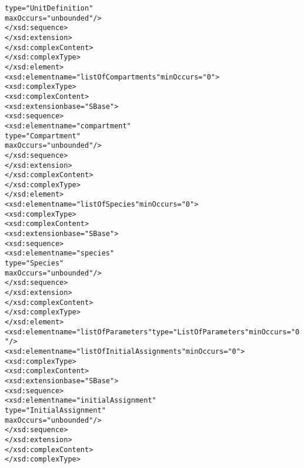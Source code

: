 \begin{alltt}
                                                     type="UnitDefinition" 
                                                     maxOccurs="unbounded"/>
                                    </xsd:sequence>
                                </xsd:extension>
                            </xsd:complexContent>
                        </xsd:complexType>
                    </xsd:element>
                    <xsd:element name="listOfCompartments" minOccurs="0">
                        <xsd:complexType>
                            <xsd:complexContent>
                                <xsd:extension base="SBase">
                                    <xsd:sequence>
                                        <xsd:element name="compartment" 
                                                     type="Compartment" 
                                                     maxOccurs="unbounded"/>
                                    </xsd:sequence>
                                </xsd:extension>
                            </xsd:complexContent>
                        </xsd:complexType>
                    </xsd:element>
                    <xsd:element name="listOfSpecies" minOccurs="0">
                        <xsd:complexType>
                            <xsd:complexContent>
                                <xsd:extension base="SBase">
                                    <xsd:sequence>
                                        <xsd:element name="species" 
                                                     type="Species" 
                                                     maxOccurs="unbounded"/>
                                    </xsd:sequence>
                                </xsd:extension>
                            </xsd:complexContent>
                        </xsd:complexType>
                    </xsd:element>
                    <xsd:element name="listOfParameters" type="ListOfParameters" minOccurs="0"/>
                    <xsd:element name="listOfInitialAssignments" minOccurs="0">
                        <xsd:complexType>
                            <xsd:complexContent>
                                <xsd:extension base="SBase">
                                    <xsd:sequence>
                                        <xsd:element name="initialAssignment" 
                                                     type="InitialAssignment" 
                                                     maxOccurs="unbounded"/>
                                    </xsd:sequence>
                                </xsd:extension>
                            </xsd:complexContent>
                        </xsd:complexType>

\end{alltt}
